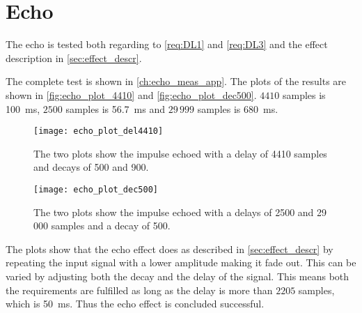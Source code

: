 \section{Echo}
The echo is tested both regarding to \autoref{req:DL1} and \autoref{req:DL3} and the effect description in \autoref{sec:effect_descr}. 

The complete test is shown in \autoref{ch:echo_meas_app}. The plots of the results are shown in \autoref{fig:echo_plot_4410} and \autoref{fig:echo_plot_dec500}. $4410$ samples is \SI{100}{\milli\second}, $2500$ samples is \SI{56,7}{\milli\second} and $29\,999$ samples is \SI{680}{\milli\second}.

\begin{figure}[hbpt]
	\centering
	\texttt{[image: echo\_plot\_del4410]}
	\caption{The two plots show the impulse echoed with a delay of 4410 samples and decays of 500 and 900.}
	\label{fig:echo_plot_4410}
\end{figure}

\begin{figure}[hbpt]
	\centering
	\texttt{[image: echo\_plot\_dec500]}
	\caption{The two plots show the impulse echoed with a delays of 2500 and 29\,000 samples and a decay of 500.}
	\label{fig:echo_plot_dec500}
\end{figure}

The plots show that the echo effect does as described in \autoref{sec:effect_descr} by repeating the input signal with a lower amplitude making it fade out. This can be varied by adjusting both the decay and the delay of the signal.
This means both the requirements are fulfilled as long as the delay is more than $ 2205 $ samples, which is \SI{50}{\milli\second}. Thus the echo effect is concluded successful.